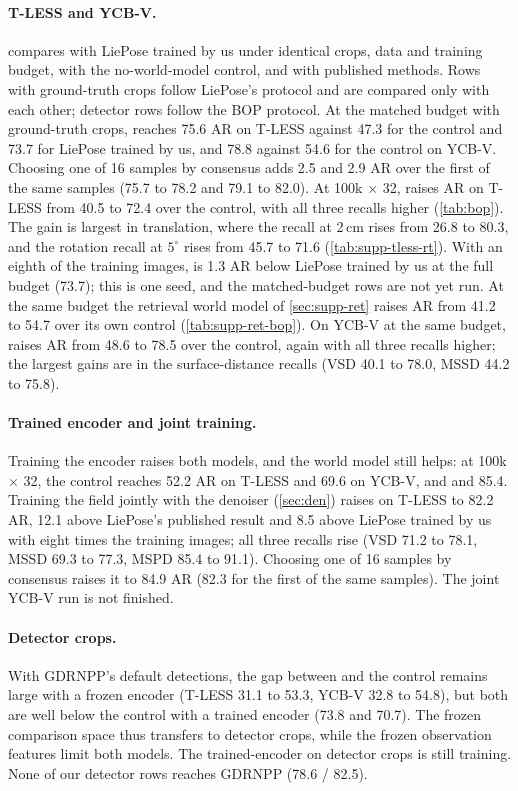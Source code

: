 \paragraph{T-LESS and YCB-V.}
 compares \method with LiePose trained by us under identical crops, data and training budget, with the no-world-model
control, and with published methods. Rows with ground-truth crops follow LiePose's protocol and are compared only with each other;
detector rows follow the BOP protocol.
At the matched budget with ground-truth crops, \method reaches 75.6 AR on T-LESS against 47.3 for the control and 73.7 for LiePose
trained by us, and 78.8 against 54.6 for the control on YCB-V. Choosing one of 16 samples by consensus adds 2.5 and 2.9 AR over the first of the same samples (75.7 to
78.2 and 79.1 to 82.0).
At 100k $\times$ 32, \method raises AR on T-LESS from 40.5 to 72.4 over the control, with all three recalls higher
(\cref{tab:bop}). The gain is largest in translation, where the recall at 2\,cm rises from 26.8 to 80.3, and the rotation recall at
$5^\circ$ rises from 45.7 to 71.6 (\cref{tab:supp-tless-rt}). With an eighth of the training images, \method is 1.3 AR below LiePose
trained by us at the full budget (73.7); this is one seed, and the matched-budget rows are not yet run. At the same budget the
retrieval world model of \cref{sec:supp-ret} raises AR from 41.2 to 54.7 over its own control (\cref{tab:supp-ret-bop}).
On YCB-V at the same budget, \method raises AR from 48.6 to 78.5 over the control, again with all three recalls higher; the largest
gains are in the surface-distance recalls (VSD 40.1 to 78.0, MSSD 44.2 to 75.8).

\paragraph{Trained encoder and joint training.}
Training the encoder raises both models, and the world model still helps: at 100k $\times$ 32, the control reaches 52.2 AR on T-LESS
and 69.6 on YCB-V, and  and 85.4. Training the field jointly with the denoiser (\cref{sec:den}) raises \method on T-LESS to
82.2 AR, 12.1 above LiePose's published result and 8.5 above LiePose trained by us with eight times the training images; all three recalls
rise (VSD 71.2 to 78.1, MSSD 69.3 to 77.3, MSPD 85.4 to 91.1). Choosing one of 16 samples by consensus raises it to 84.9 AR
(82.3 for the first of the same samples). The joint YCB-V run is not finished.

\paragraph{Detector crops.}
With GDRNPP's default detections, the gap between \method and the control remains large with a frozen encoder (T-LESS 31.1 to 53.3,
YCB-V 32.8 to 54.8), but both are well below the control with a trained encoder (73.8 and 70.7). The frozen comparison space thus
transfers to detector crops, while the frozen observation features limit both models. The trained-encoder \method on detector crops is
still training. None of our detector rows reaches GDRNPP (78.6 / 82.5).

